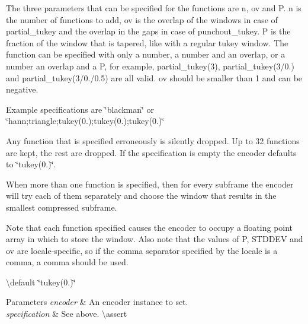 The three parameters that can be specified for the functions are n, ov and P. n is the number of functions to add, ov is the overlap of the windows in case of partial\+\_\+tukey and the overlap in the gaps in case of punchout\+\_\+tukey. P is the fraction of the window that is tapered, like with a regular tukey window. The function can be specified with only a number, a number and an overlap, or a number an overlap and a P, for example, partial\+\_\+tukey(3), partial\+\_\+tukey(3/0.) and partial\+\_\+tukey(3/0./0.5) are all valid. ov should be smaller than 1 and can be negative.

Example specifications are {\ttfamily \char`\"{}blackman\char`\"{}} or {\ttfamily \char`\"{}hann;triangle;tukey(0.);tukey(0.);tukey(0.)\char`\"{}} 

Any function that is specified erroneously is silently dropped. Up to 32 functions are kept, the rest are dropped. If the specification is empty the encoder defaults to {\ttfamily \char`\"{}tukey(0.)\char`\"{}}.

When more than one function is specified, then for every subframe the encoder will try each of them separately and choose the window that results in the smallest compressed subframe.

Note that each function specified causes the encoder to occupy a floating point array in which to store the window. Also note that the values of P, S\+T\+D\+D\+EV and ov are locale-\/specific, so if the comma separator specified by the locale is a comma, a comma should be used.

\textbackslash{}default {\ttfamily \char`\"{}tukey(0.)\char`\"{}} 
\begin{DoxyParams}{Parameters}
{\em encoder} & An encoder instance to set. \\
\hline
{\em specification} & See above. \textbackslash{}assert 
\begin{DoxyCode}{1}
\end{DoxyCode}
 
\begin{DoxyCode}{1}
\end{DoxyCode}
 \\
\hline
\end{DoxyParams}

